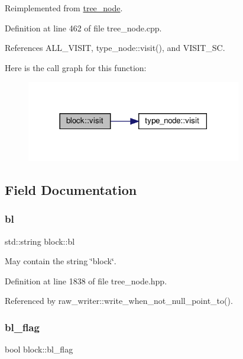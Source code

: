 Reimplemented from \hyperlink{classtree__node_aa9abba3f1b30e0be80b4a56b188c6ecc}{tree\+\_\+node}.



Definition at line 462 of file tree\+\_\+node.\+cpp.



References A\+L\+L\+\_\+\+V\+I\+S\+IT, type\+\_\+node\+::visit(), and V\+I\+S\+I\+T\+\_\+\+SC.

Here is the call graph for this function\+:
\nopagebreak
\begin{figure}[H]
\begin{center}
\leavevmode
\includegraphics[width=266pt]{d1/d7f/structblock_a637ca9811cf1cf93dd10c10cb174b9c4_cgraph}
\end{center}
\end{figure}


\subsection{Field Documentation}
\mbox{\label{structblock_a42349bc8e59e65ef46f60ef9c63c2109}} 
\subsubsection{\texorpdfstring{bl}{bl}}
{\footnotesize\ttfamily std\+::string block\+::bl}



May contain the string \char`\"{}block\char`\"{}. 



Definition at line 1838 of file tree\+\_\+node.\+hpp.



Referenced by raw\+\_\+writer\+::write\+\_\+when\+\_\+not\+\_\+null\+\_\+point\+\_\+to().

\mbox{\label{structblock_ac86db00633ff0df8ce2cb9ac8a757310}} 
\subsubsection{\texorpdfstring{bl\+\_\+flag}{bl\_flag}}
{\footnotesize\ttfamily bool block\+::bl\+\_\+flag}



